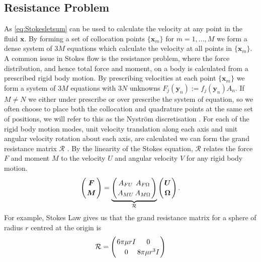 \subsection{Resistance Problem} \label{sec:resistance}
As \cref{eq:Stokesletsum} can be used to calculate the velocity at any point in the fluid $\bm{x}$. By forming a set of collocation points $\{\bm{x}_m\}$ for $m=1,...,M$ we form a dense system of $3M$ equations which calculate the velocity at all points in $\{\bm{x}_m\}$. 
A common issue in Stokes flow is the resistance problem, where the force distribution, and hence total force and moment, on a body is calculated from a prescribed rigid body motion. By prescribing velocities at each point $\{\bm{x}_m\}$ we form a system of $3M$ equations with $3N$ unknowns $F_j(\bm{y}_n) := f_j(\bm{y}_n)A_n$. If $M \neq N$ we either under prescribe or over prescribe the system of equation, so we often choose to place both the collocation and quadrature points at the same set of positions, we will  refer to this as the Nyström discretisation \cite{Nystrom1930UberRandwertaufgaben}. For each of the rigid body motion modes, unit velocity translation along each axis and unit angular velocity rotation about each axis, are calculated we can form the grand resistance matrix $\mathcal{R}$ \cite{Pozrikidis1992BoundaryFlow}. By the linearity of the Stokes equation, $\mathcal{R}$ relates the force $F$ and moment $M$ to the velocity $U$ and angular velocity $V$ for any rigid body motion. 
\begin{equation}
\arraycolsep=1pt\def\arraystretch{1.2}
\left(
\begin{array}{c}
\boldsymbol{F} \\
\boldsymbol{M}
\end{array}\right)=\underbrace{\left(\begin{array}{cc}
A_{F U} & A_{F \Omega} \\
A_{M U} & A_{M \Omega}
\end{array}\right)}_{\mathcal{R}}\left(\begin{array}{c}
\boldsymbol{U} \\
\boldsymbol{\Omega}
\end{array}\right) .
\label{eq:GrandResistance}
\end{equation}
 For example, Stokes Law gives us that the grand resistance matrix for a sphere of radius $r$ centred at the origin is
 \begin{equation}
\arraycolsep=1pt\def\arraystretch{1.2}
\mathcal{R}=\left(\begin{array}{cc}
6\pi\mu r I & 0 \\
0 & 8\pi\mu r^3 I
\end{array}\right)
\label{eq:sphereres}
\end{equation}
